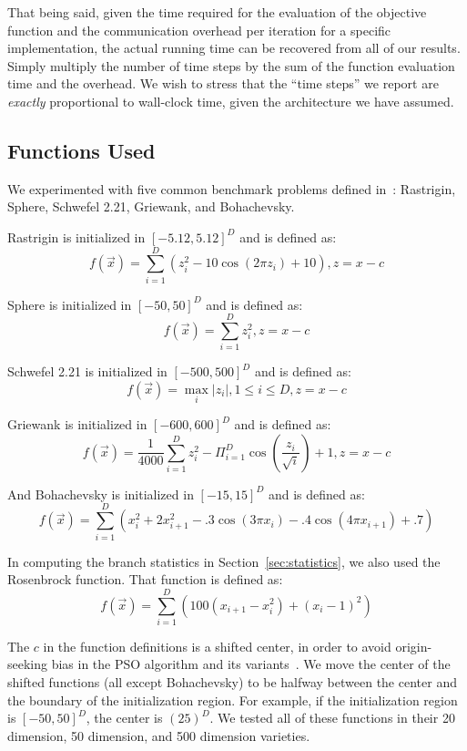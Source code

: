 \documentclass[smallcondensed]{svjour3}
\renewcommand{\sec}[1]{Section~\ref{sec:#1}}
\begin{document}
That being said, given the time required for the evaluation of the objective
function and the communication overhead per iteration for a specific
implementation, the actual running time can be recovered from all of our
results.  Simply multiply the number of time steps by the sum of the function
evaluation time and the overhead.  We wish to stress that the ``time steps'' we
report are \emph{exactly} proportional to wall-clock time, given the
architecture we have assumed.

\subsection{Functions Used}

We experimented with five common benchmark problems defined
in~\citep{herrera-2010-test-suite}: Rastrigin, Sphere, Schwefel 2.21, Griewank,
and Bohachevsky.

Rastrigin is initialized in $[-5.12,5.12]^D$ and is defined as:
\[f(\Vec{x}) = \sum_{i=1}^D\left(z_i^2 - 10\cos\left(2\pi z_i\right) +
10\right), z=x-c\]

Sphere is initialized in $[-50,50]^D$ and is defined as:
\[f(\Vec{x}) = \sum_{i=1}^D z_i^2, z=x-c\]

Schwefel 2.21 is initialized in $[-500,500]^D$ and is defined as:
\[f(\Vec{x}) = \max_i{|z_i|, 1 \leq i \leq D}, z=x-c\]

Griewank is initialized in $[-600,600]^D$ and is defined as:
\[f(\Vec{x}) = \frac{1}{4000}\sum_{i=1}^D z_i^2 - \Pi_{i=1}^D
\cos\left(\frac{z_i}{\sqrt{i}} \right) + 1, z=x-c\]

And Bohachevsky is initialized in $[-15,15]^D$ and is defined as:
\[f(\Vec{x}) = \sum_{i=1}^D(x_i^2+2x_{i+1}^2-.3\cos(3\pi x_i)-.4\cos(4\pi
x_{i+1})+.7)\]

In computing the branch statistics in \sec{statistics}, we also used the
Rosenbrock function.  That function is defined as:
\[f(\Vec{x}) = \sum_{i=1}^D \left(100(x_{i+1}-x_i^2)+(x_i-1)^2\right)\]

The $c$ in the function definitions is a shifted center, in order to avoid
origin-seeking bias in the PSO algorithm and its
variants~\citep{monson-2005-origin-seeking-bias}.  We move the center of the
shifted functions (all except Bohachevsky) to be halfway between the center and
the boundary of the initialization region.  For example, if the initialization
region is $[-50,50]^D$, the center is $(25)^D$.  We tested all of these
functions in their 20 dimension, 50 dimension, and 500 dimension varieties.
\end{document}
